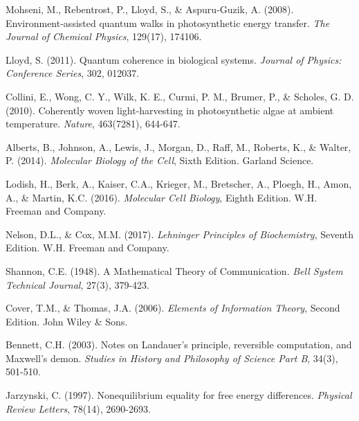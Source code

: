 \documentclass[11pt,a4paper]{article}
\begin{document}
\begin{thebibliography}{99}
Mohseni, M., Rebentrost, P., Lloyd, S., \& Aspuru‐Guzik, A. (2008). Environment‐assisted quantum walks in photosynthetic energy transfer. \textit{The Journal of Chemical Physics}, 129(17), 174106.

Lloyd, S. (2011). Quantum coherence in biological systems. \textit{Journal of Physics: Conference Series}, 302, 012037.

Collini, E., Wong, C. Y., Wilk, K. E., Curmi, P. M., Brumer, P., \& Scholes, G. D. (2010). Coherently woven light-harvesting in photosynthetic algae at ambient temperature. \textit{Nature}, 463(7281), 644-647.

Alberts, B., Johnson, A., Lewis, J., Morgan, D., Raff, M., Roberts, K., \& Walter, P. (2014). \textit{Molecular Biology of the Cell}, Sixth Edition. Garland Science.

Lodish, H., Berk, A., Kaiser, C.A., Krieger, M., Bretscher, A., Ploegh, H., Amon, A., \& Martin, K.C. (2016). \textit{Molecular Cell Biology}, Eighth Edition. W.H. Freeman and Company.

Nelson, D.L., \& Cox, M.M. (2017). \textit{Lehninger Principles of Biochemistry}, Seventh Edition. W.H. Freeman and Company.

Shannon, C.E. (1948). A Mathematical Theory of Communication. \textit{Bell System Technical Journal}, 27(3), 379-423.

Cover, T.M., \& Thomas, J.A. (2006). \textit{Elements of Information Theory}, Second Edition. John Wiley \& Sons.

Bennett, C.H. (2003). Notes on Landauer's principle, reversible computation, and Maxwell's demon. \textit{Studies in History and Philosophy of Science Part B}, 34(3), 501-510.

Jarzynski, C. (1997). Nonequilibrium equality for free energy differences. \textit{Physical Review Letters}, 78(14), 2690-2693.

\end{thebibliography}
\end{document}
